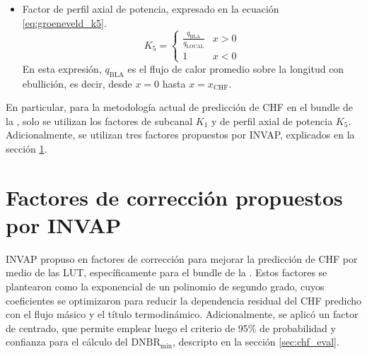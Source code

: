 \begin{itemize}
    \item Factor de perfil axial de potencia, expresado en la ecuación \ref{eq:groeneveld_k5}.
    \begin{equation}
        \label{eq:groeneveld_k5}
        K_5 = \begin{cases}
            \frac{q_\mathrm{BLA}}{q_\mathrm{LOCAL}} & x > 0 \\
            1 & x < 0
        \end{cases}
    \end{equation}
    En esta expresión, $q_\mathrm{BLA}$ es el flujo de calor promedio sobre la longitud con ebullición, es decir, desde $x=0$ hasta $x=x_\mathrm{CHF}$.
\end{itemize}

En particular, para la metodología actual de predicción de CHF en el bundle de la \cna{}, solo se utilizan los factores de subcanal $K_1$ y de perfil axial de potencia $K_5$. Adicionalmente, se utilizan tres factores propuestos por INVAP, explicados en la sección \ref{sec:app_tmf}.

\section{Factores de corrección propuestos por INVAP}
\label{sec:app_tmf}
INVAP propuso en \citep{invapTMF1, invapTMF2} factores de corrección para mejorar la predicción de CHF por medio de las LUT, específicamente para el bundle de la \cna{}. Estos factores se plantearon como la exponencial de un polinomio de segundo grado, cuyos coeficientes se optimizaron para reducir la dependencia residual del CHF predicho con el flujo másico y el título termodinámico. Adicionalmente, se aplicó un factor de centrado, que permite emplear luego el criterio de 95\% de probabilidad y confianza para el cálculo del $\mathrm{DNBR}_\mathrm{min}$, descripto en la sección \ref{sec:chf_eval}.